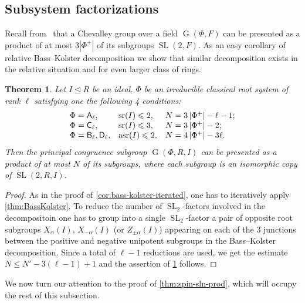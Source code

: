 \documentclass[11pt]{amsart}
\theoremstyle{plain}
\newtheorem{thm}{Theorem}
\numberwithin{equation}{section}
\numberwithin{lemma}{section}
\theoremstyle{definition}
\theoremstyle{remark}
\DeclareMathOperator{\G}{G}
\DeclareMathOperator{\SL}{SL}
\DeclareMathOperator{\sr}{sr}
\DeclareMathOperator{\asr}{asr}
\newcommand{\rA}{\mathsf{A}}
\newcommand{\rB}{\mathsf{B}}
\newcommand{\rC}{\mathsf{C}}
\newcommand{\rD}{\mathsf{D}}
\begin{document}
\subsection{Subsystem factorizations}\label{sec:subsysfact}
Recall from~\cite{LNS11, V13} that a Chevalley group over a field $\G(\Phi, F)$ can be presented as a product of at most $3|\Phi^+|$ of its subgroups $\SL(2, F)$.
As an easy corollary of relative Bass--Kolster decomposition we show that similar decomposition exists in the relative situation and for even larger class of rings.
\begin{thm}\label{thm:SL2width}
Let $I\trianglelefteq R$ be an ideal, $\Phi$ be an irreducible classical root system of rank $\ell$ satisfying one the following 4 conditions:
\[\begin{array}{l@{\quad}l@{\quad}l}
\Phi=\rA_\ell, & \sr(I)\leqslant 2, & N=3\left|\Phi^+\right| - \ell - 1; \\
\Phi=\rC_\ell, & \sr(I)\leqslant 3, & N=3\left|\Phi^+\right| - 2; \\
\Phi=\rB_\ell, \rD_\ell, & \asr(I)\leqslant 2, & N=4\left|\Phi^+\right| - 3\ell.
\end{array}\]
Then the principal congruence subgroup $\G(\Phi, R, I)$ can be presented as a product of at most $N$ of its subgroups, 
 where each subgroup is an isomorphic copy of $\SL(2, R, I)$.
\end{thm}

\begin{proof}
 As in the proof of \cref{cor:bass-kolster-iterated}, one has to iteratively apply \cref{thm:BassKolster}.
 To reduce the number of $\SL_2$-factors involved in the decompositoin one has to group into a single $\SL_2$-factor a pair of opposite root subgroups $X_{\alpha}(I)$, $X_{-\alpha}(I)$ (or $Z_{\pm\alpha}(I)$) appearing on each
 of the $3$ junctions between the positive and negative unipotent subgroups in the Bass--Kolster decomposition.
 Since a total of $\ell-1$ reductions are used, we get the estimate $N \leq N' - 3(\ell - 1) + 1$ and the assertion of \cref{thm:SL2width} follows.
\end{proof}

We now turn our attention to the proof of \cref{thm:spin-sln-prod}, which will occupy the rest of this subsection.
\end{document}
